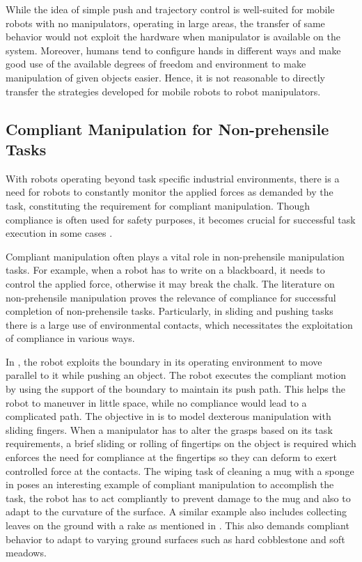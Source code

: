 \documentclass[rnd]{mas_proposal}
\begin{document}
 While the idea of simple push and trajectory control is well-suited for mobile robots with no manipulators, operating in large areas, the transfer of same behavior would not exploit the hardware when manipulator is available on the system. Moreover, humans tend to configure hands in different ways and make good use of the available degrees of freedom and environment to make manipulation of given objects easier. Hence, it is not reasonable to directly transfer the strategies developed for mobile robots to robot manipulators.  



\subsection{Compliant Manipulation for Non-prehensile Tasks}


With robots operating beyond task specific industrial environments, there is a need for robots to constantly monitor the applied forces as demanded by the task, constituting the requirement for compliant manipulation. Though compliance is often used for safety purposes, it becomes crucial for successful task execution in some cases \cite{leidner2019cognitive}. 

Compliant manipulation often plays a vital role in non-prehensile manipulation tasks. For example, when a robot has to write on a blackboard, it needs to control the applied force, otherwise it may break the chalk. The literature on non-prehensile manipulation proves the relevance of compliance for successful completion of non-prehensile tasks. Particularly, in sliding and pushing tasks there is a large use of environmental contacts, which necessitates the exploitation of compliance in various ways.

In \cite{nieuwenhuisen2005path}, the robot exploits the boundary in its operating environment to move parallel to it while pushing an object. The robot executes the compliant motion by using the support of the boundary to maintain its push path. This helps the robot to maneuver in little space, while no compliance would lead to a complicated path. The objective in \cite{kao1992quasistatic} is to model dexterous manipulation with sliding fingers. When a manipulator has to alter the grasps based on its task requirements, a brief sliding or rolling of fingertips on the object is required which enforces the need for compliance at the fingertips so they can deform to exert controlled force at the contacts. The wiping task of cleaning a mug with a sponge in \cite{leidner2016knowledge} poses an interesting example of compliant manipulation to accomplish the task, the robot has to act compliantly to prevent damage to the mug and also to adapt to the curvature of the surface. A similar example also includes collecting leaves on the ground with a rake as mentioned in \cite{leidner2019cognitive}. This also demands compliant behavior to adapt to varying ground surfaces such as hard cobblestone and soft meadows.
\end{document}
